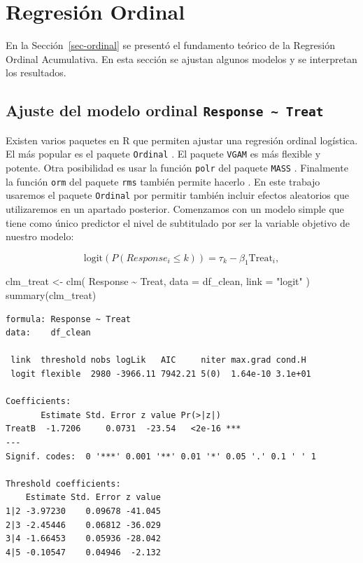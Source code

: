 \documentclass[
  12pt,
  a4paper,
  extrafontsizes,
  onecolumn,
  openright]{memoir}
\newenvironment{Shaded}{\begin{snugshade}}{\end{snugshade}}
\newcommand{\AttributeTok}[1]{\textcolor[rgb]{0.40,0.45,0.13}{#1}}
\newcommand{\FunctionTok}[1]{\textcolor[rgb]{0.28,0.35,0.67}{#1}}
\newcommand{\NormalTok}[1]{\textcolor[rgb]{0.00,0.23,0.31}{#1}}
\newcommand{\OtherTok}[1]{\textcolor[rgb]{0.00,0.23,0.31}{#1}}
\newcommand{\SpecialCharTok}[1]{\textcolor[rgb]{0.37,0.37,0.37}{#1}}
\newcommand{\StringTok}[1]{\textcolor[rgb]{0.13,0.47,0.30}{#1}}
\begin{document}
\hypertarget{sec-ordinal-2}{%
\section{Regresión Ordinal}\label{sec-ordinal-2}}

En la Sección~\ref{sec-ordinal} se presentó el fundamento teórico de la
Regresión Ordinal Acumulativa. En esta sección se ajustan algunos
modelos y se interpretan los resultados.

\hypertarget{ajuste-del-modelo-ordinal-response-treat}{%
\subsection{\texorpdfstring{Ajuste del modelo ordinal
\texttt{Response\ \textasciitilde{}\ Treat}}{Ajuste del modelo ordinal Response \textasciitilde{} Treat}}\label{ajuste-del-modelo-ordinal-response-treat}}

Existen varios paquetes en R que permiten ajustar una regresión ordinal
logística. El más popular es el paquete \texttt{Ordinal}
\autocite{ordinalR}. El paquete \texttt{VGAM} \autocite{VGAMR} es más
flexible y potente. Otra posibilidad es usar la función \texttt{polr}
del paquete \texttt{MASS} \autocite{MASSR}. Finalmente la función
\texttt{orm} del paquete \texttt{rms} también permite hacerlo
\autocite[ver][]{harrell2015}. En este trabajo usaremos el paquete
\texttt{Ordinal} por permitir también incluir efectos aleatorios que
utilizaremos en un apartado posterior. Comenzamos con un modelo simple
que tiene como único predictor el nivel de subtitulado por ser la
variable objetivo de nuestro modelo:

\[
\text{logit}(P(Response_i \leq k)) = \tau_k - \beta_1 \text{Treat}_i,
\]

\scriptsize

\begin{Shaded}
\begin{Highlighting}[]
\NormalTok{clm\_treat }\OtherTok{\textless{}{-}}
    \FunctionTok{clm}\NormalTok{(}
\NormalTok{        Response }\SpecialCharTok{\textasciitilde{}}\NormalTok{ Treat,}
        \AttributeTok{data =}\NormalTok{ df\_clean, }\AttributeTok{link =} \StringTok{"logit"}
\NormalTok{    )}
\FunctionTok{summary}\NormalTok{(clm\_treat)}
\end{Highlighting}
\end{Shaded}

\begin{verbatim}
formula: Response ~ Treat
data:    df_clean

 link  threshold nobs logLik   AIC     niter max.grad cond.H 
 logit flexible  2980 -3966.11 7942.21 5(0)  1.64e-10 3.1e+01

Coefficients:
       Estimate Std. Error z value Pr(>|z|)    
TreatB  -1.7206     0.0731  -23.54   <2e-16 ***
---
Signif. codes:  0 '***' 0.001 '**' 0.01 '*' 0.05 '.' 0.1 ' ' 1

Threshold coefficients:
    Estimate Std. Error z value
1|2 -3.97230    0.09678 -41.045
2|3 -2.45446    0.06812 -36.029
3|4 -1.66453    0.05936 -28.042
4|5 -0.10547    0.04946  -2.132
\end{verbatim}
\end{document}
